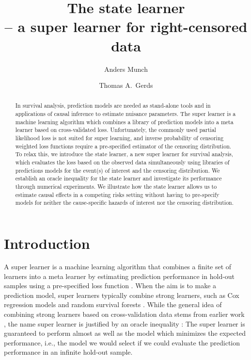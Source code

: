 \documentclass{statsoc}
\title[The state learner]{The state learner \\ {-- a super learner for right-censored data}}
\author[Anders Munch {\it et al.}]{Anders Munch}
\author{Thomas A.\ Gerds}
\numberwithin{theorem}{section}
\newcommand{\1}{\mathds{1}}
\begin{document}
\begin{abstract}
  In survival analysis, prediction models are needed as stand-alone tools and in
  applications of causal inference to estimate nuisance parameters. The super
  learner is a machine learning algorithm which combines a library of prediction
  models into a meta learner based on cross-validated loss. Unfortunately, the
  commonly used partial likelihood loss is not suited for super learning, and
  inverse probability of censoring weighted loss functions require a
  pre-specified estimator of the censoring distribution. To relax this, we
  introduce the state learner, a new super learner for survival analysis, which
  evaluates the loss based on the observed data simultaneously using libraries
  of predictions models for the event(s) of interest and the censoring
  distribution. We establish an oracle inequality for the state learner and
  investigate its performance through numerical experiments. We illustrate how
  the state learner allows us to estimate causal effects in a competing risks
  setting without having to pre-specify models for neither the cause-specific
  hazards of interest nor the censoring distribution.
\end{abstract}


\section{Introduction}
\label{sec:introduction}

A super learner is a machine learning algorithm that combines a finite
set of learners into a meta learner by estimating prediction
performance in hold-out samples using a pre-specified loss function
\citep{van2007super}. When the aim is to make a prediction model,
super learners typically combine strong learners, such as Cox
regression models and random survival forests
\citep{gerds2021medical}.
While the general idea of combining strong learners based on cross-validation
data stems from earlier work \citep{wolpert1992stacked,breiman1996stacked}, the
name super learner is justified by an oracle inequality
\citep{van2003unicv,vaart2006oracle}: The super learner is guaranteed to perform
almost as well as the model which minimizes the expected performance, i.e., the
model we would select if we could evaluate the prediction performance in an
infinite hold-out sample.
\end{document}
